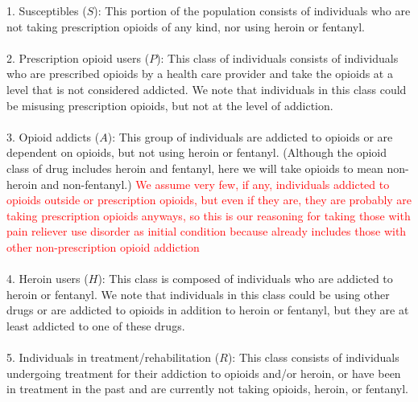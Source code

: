 \documentclass[12pt]{article}
\begin{document}
1. Susceptibles ($S$): This portion of the population consists of individuals who are not taking prescription opioids of any kind, nor using heroin or fentanyl. \\ \\
2. Prescription opioid users ($P$): This class of individuals consists of individuals who are prescribed opioids by a health care provider and take the opioids at a level that is not considered addicted. We note that individuals in this class could be misusing prescription opioids, but not at the level of addiction.  \\ \\ %
3. Opioid addicts ($A$): This group of individuals are addicted to opioids or are dependent on opioids, but not using heroin or fentanyl. (Although the opioid class of drug includes heroin and fentanyl, here we will take opioids to mean non-heroin and non-fentanyl.) \textcolor{red}{We assume very few, if any, individuals addicted to opioids outside or prescription opioids, but even if they are, they are probably are taking prescription opioids anyways, so this is our reasoning for taking those with pain reliever use disorder as initial condition because already includes those with other non-prescription opioid addiction} \\ \\
4. Heroin users ($H$): This class is composed of individuals who are addicted to heroin or fentanyl. We note that individuals in this class could be using other drugs or are addicted to opioids in addition to heroin or fentanyl, but they are at least addicted to one of these drugs. \\ \\
5. Individuals in treatment/rehabilitation ($R$): This class consists of individuals undergoing treatment for their addiction to opioids and/or heroin, or have been in treatment in the past and are currently not taking opioids, heroin, or fentanyl.

\end{document}
